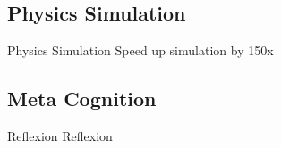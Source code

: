\subsection{Physics Simulation}
\begin{frame}[c]{Physics Simulation}
    Speed up simulation by 150x \cite{wiewel_latent_2019}
\end{frame}

\subsection{Meta Cognition}
\begin{frame}[c]{Reflexion}
    Reflexion \cite{shinn_reflexion_2023}
\end{frame}
